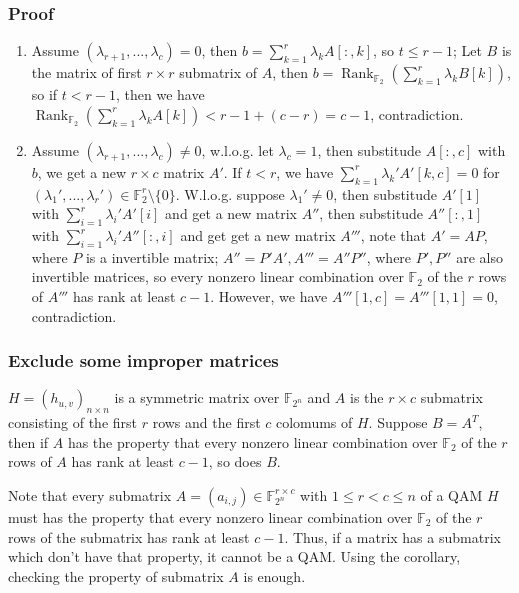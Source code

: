 \documentclass[
    aspectratio=169,                   %
]{beamer}
\newcommand{\F}{\mathbb{F}}
\begin{document}
    \begin{frame}
        \frametitle{Proof}
        \begin{enumerate}
            \item Assume $ (\lambda_{r+1},...,\lambda_c)=0 $, then $ b=\sum_{k=1}^{r}\lambda_kA[:,k] $, so 
            $ t\le r-1 $; Let $ B $ is the matrix of first $ r\times r $ submatrix of $ A $, then 
            $ b=\operatorname{Rank}_{\F_2}(\sum_{k=1}^{r}\lambda_kB[k]) $, so if $ t<r-1 $, then we have 
            $ \operatorname{Rank}_{\F_2}(\sum_{k=1}^{r}\lambda_kA[k])<r-1+(c-r)=c-1 $, contradiction.
            \item Assume $ (\lambda_{r+1},...,\lambda_c) \ne 0 $, w.l.o.g. let $ \lambda_c=1 $, then substitude 
            $ A[:,c] $ with $ b $, we get a new $ r\times c $ matrix $ A' $. 
            If $ t<r $, we have $ \sum_{k=1}^{r}\lambda_k'A'[k,c]=0 $ for 
            $ (\lambda_1',...,\lambda_r')\in\F_{2}^{r}\setminus\{0\} $.
            W.l.o.g. suppose $ \lambda_1'\ne 0 $, 
            then substitude $ A'[1] $ with $ \sum_{i=1}^{r}\lambda_i'A'[i] $ and get a new matrix $ A'' $, 
            then substitude $ A''[:,1] $ with $ \sum_{i=1}^{r}\lambda_i'A''[:,i] $ and get get a new matrix $ A''' $,
            note that $ A'=AP $, where $ P $ is a invertible matrix; $ A''=P'A',A'''=A''P'' $, where $ P',P'' $ are 
            also invertible matrices, so every nonzero linear combination over $\F_2$ of the $r$ rows of $A'''$ 
            has rank at least $c − 1$. However, we have $ A'''[1,c]=A'''[1,1]=0 $, contradiction.  
        \end{enumerate}
        
    \end{frame}
    
    \begin{frame}
        \frametitle{Exclude some improper matrices}
        
        \begin{corollary}
            $ H=(h_{u,v})_{n\times n} $ is a symmetric matrix over $\F_{2^n}$ and $ A $ is the $ r\times c $
            submatrix consisting of the first $ r $ rows and the first $ c $ colomums of $ H $. Suppose $ B=A^T $,
            then if $ A $ has the property that every nonzero linear combination over $\F_2$ of the $r$ rows of $A$
            has rank at least $c − 1$, so does $ B $.
        \end{corollary}

        Note that every submatrix $ A=(a_{i,j})\in\F_{2^n}^{r\times c} $ with $1\le r<c\le n $ of a QAM $ H $ must
        has the property that every nonzero linear combination over $\F_2$ of the $r$ rows of the submatrix 
        has rank at least $c − 1$. Thus, if a matrix has a submatrix which don't have that property, it cannot be 
        a QAM. Using the corollary, checking the property of submatrix $ A $ is enough.  
        
    \end{frame}
\end{document}
